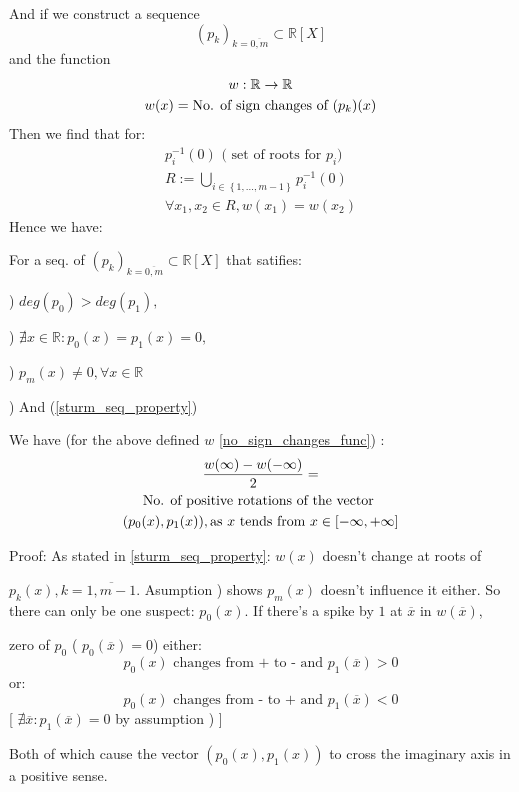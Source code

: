 And if we construct a sequence
\[
(p_k)_{k = \overline{0,m}} \subset \mathbb{R}[X]
\]
and the function
\begin{gather}\label{no_sign_changes_func}
w : \mathbb{R} \rightarrow \mathbb{R} \notag  \\
w(x) = \text{No. of sign changes of  } (p_k)(x) \notag
\end{gather}
Then we find that for:
\begin{gather*}
p_i^{-1}(0) \text{ ( set of roots for $p_i$) } \\
R := \bigcup_{i \in \left\{ 1, \dots, m-1 \right\} } p_i^{-1}(0) \\
\forall x_1, x_2 \in R, w(x_1) = w(x_2)
\end{gather*}
Hence we have:
\begin{lemma}\label{sturm_lemma}
For a seq. of $  (p_k)_{k = \overline{0,m}} \subset \mathbb{R}[X]$
that satifies:

)
$ deg(p_0) > deg(p_1), $

)
$\nexists x \in \mathbb{R} : p_0(x) = p_1(x) = 0, $

)
$p_m(x) \neq 0, \forall x \in \mathbb{R}$

)
And (\ref{sturm_seq_property})
\par
We have (for the above defined $w$ \ref{no_sign_changes_func}) :
\begin{gather}
\frac{w(\infty) - w(-\infty)}{2} =  \notag \\
\text{No. of positive rotations of the vector } \notag \\
(p_0(x), p_1(x)), \text{as $x$ tends from  } x \in [-\infty, +\infty] \notag
\end{gather}
\end{lemma}

Proof: As stated in \ref{sturm_seq_property}: $w(x)$ doesn't change at roots of

$p_k(x), k = \overline{1,m-1}$. Asumption ) shows $p_m(x)$
doesn't influence it either. So there can only be one suspect:
$p_0(x)$. If there's a spike by $1$ at $\overline{x}$ in $w(\overline{x})$,

zero of $p_0$
(   $p_0(\overline{x}) =0 $) either:
\[
p_0(x) \text{ changes from + to - and   } p_1(\overline{x}) > 0
\]
or:
\[
p_0(x) \text{ changes from - to + and  } p_1(\overline{x}) < 0
\]
[   $\nexists \overline{x}: p_1(\overline{x}) = 0$ by assumption )  ]

Both of which cause the vector $(p_0(x), p_1(x))$ to cross the
imaginary axis in a positive sense.

